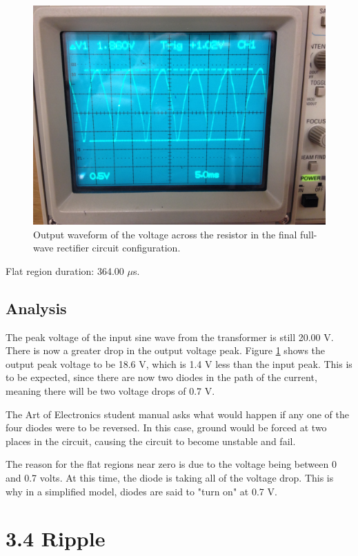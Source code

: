 \documentclass[12pt,letterpaper]{report}
\newlength \figwidth
\begin{document}
\begin{figure}[H]
\centering
\includegraphics[width=\figwidth, keepaspectratio=true]{lab4/3_3_resistor.jpg}
\caption{Output waveform of the voltage across the resistor in the final full-wave rectifier circuit configuration.}
\label{fig:3.3_resistor}
\end{figure}

Flat region duration: 364.00 $\mu$s.

\subsection*{Analysis}

The peak voltage of the input sine wave from the transformer is still 20.00 V. There is now a greater drop in the output voltage peak. Figure \ref{fig:3.3_resistor} shows the output peak voltage to be 18.6 V, which is 1.4 V less than the input peak. This is to be expected, since there are now two diodes in the path of the current, meaning there will be two voltage drops of 0.7 V.

The Art of Electronics student manual asks what would happen if any one of the four diodes were to be reversed. In this case, ground would be forced at two places in the circuit, causing the circuit to become unstable and fail.

The reason for the flat regions near zero is due to the voltage being between 0 and 0.7 volts. At this time, the diode is taking all of the voltage drop. This is why in a simplified model, diodes are said to "turn on" at 0.7 V.

\section*{3.4 Ripple}
\end{document}
